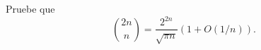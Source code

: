 \begin{statement}{30}
  Pruebe que
  \[
    \binom{2n}{n} = \frac{2^{2n}}{\sqrt{\pi n}} (1 + O(1 / n)).
  \]
\end{statement}